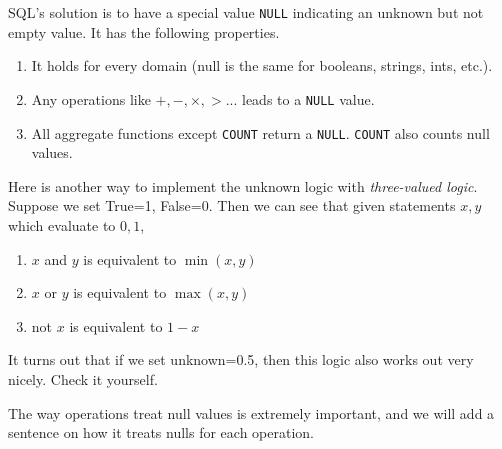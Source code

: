    \begin{definition}
      \label{def:null-2}
      SQL's solution is to have a special value \texttt{NULL} indicating an unknown but not empty value. It has the following properties. 
      \begin{enumerate}
        \item It holds for every domain (null is the same for booleans, strings, ints, etc.). 
        \item Any operations like $+, -, \times, >$... leads to a \texttt{NULL} value. 
        \item All aggregate functions except \texttt{COUNT} return a \texttt{NULL}. \texttt{COUNT} also counts null values. 
      \end{enumerate}
    \end{definition}

    \begin{theorem}
      \label{thm:three-valued-logic}
      Here is another way to implement the unknown logic with \textit{three-valued logic}. Suppose we set True=1, False=0. Then we can see that given statements $x, y$ which evaluate to $0, 1$, 
      \begin{enumerate}
        \item $x$ and $y$ is equivalent to $\min(x, y)$
        \item $x$ or $y$ is equivalent to $\max(x, y)$ 
        \item not $x$ is equivalent to $1 - x$
      \end{enumerate}
      It turns out that if we set unknown=0.5, then this logic also works out very nicely. Check it yourself. 
    \end{theorem}

    The way operations treat null values is extremely important, and we will add a sentence on how it treats nulls for each operation. 

